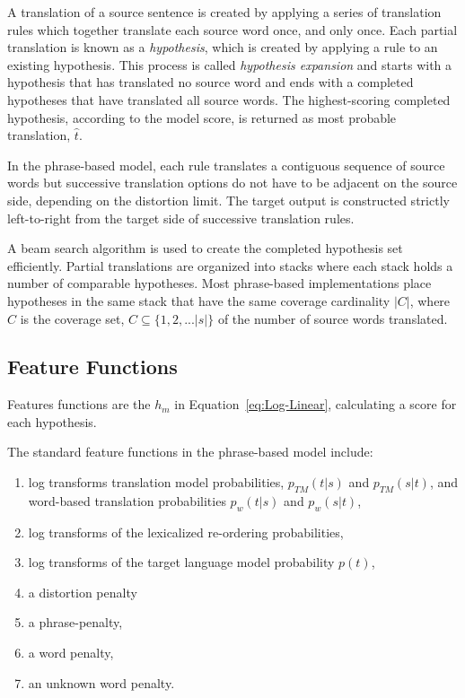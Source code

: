 \documentclass[11pt]{article}
\begin{document}
A translation of a source sentence is created by applying a series of translation rules which together translate each source word once, and only once. Each partial translation is known as a \emph{hypothesis}, which is created by applying a rule to an existing hypothesis. This process is called \emph{hypothesis expansion} and starts with a hypothesis that has translated no source word and ends with a completed hypotheses that have translated all source words. The highest-scoring completed hypothesis, according to the model score, is returned as  most probable translation, $\hat{t} $.

In the phrase-based model, each rule translates a contiguous sequence of source words but successive translation options do not have to be adjacent on the source side, depending on the distortion limit. The target output is constructed strictly left-to-right from the target side of successive translation rules. 

A beam search algorithm is used to create the completed hypothesis set efficiently. Partial translations are organized into stacks where each stack holds a number of comparable hypotheses. Most phrase-based implementations place hypotheses in the same stack that have the same coverage cardinality $|C|$, where $C$ is  the coverage set, $C \subseteq \{1,2,... |s| \} $ of the number of  source words translated. 

\subsection{Feature Functions}

Features functions are the $h_m$ in Equation~\ref{eq:Log-Linear}, calculating a score for each hypothesis.

The standard feature functions in the phrase-based model include:
\begin{enumerate}
  \item \vspace{-2 mm} log transforms translation model probabilities, $p_{TM}(t|s) $ and $p_{TM}(s|t)$, and word-based translation probabilities $p_w(t|s)$ and $p_w(s|t)$,
  \item \vspace{-2 mm} log transforms of the lexicalized re-ordering probabilities,
  \item \vspace{-2 mm} log transforms of the target language model probability $p(t)$, 
  \item \vspace{-2 mm} a distortion penalty
  \item \vspace{-2 mm} a phrase-penalty,
  \item \vspace{-2 mm} a word penalty,
  \item \vspace{-2 mm} an unknown word penalty.
\end{enumerate}
\end{document}
